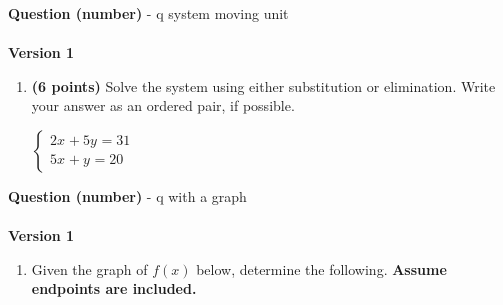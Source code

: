 \documentclass[12pt]{amsart}
\begin{document}
\begin{enumerate}[resume]
 \end{enumerate}\newpage\newpage\def \xis{3}\def \yis{5}\def \nomatcho{[2,5,3,2]}\def \a{-2}\def \c{-5}\def \b{3}\def \d{-2}\def \polyonesol{9}\def \polytwosol{-25}\def \xgoodone{-2x^{}}\def \ygoodone{+3y^{}}\def \xgoodtwo{-5x^{}}\def \ygoodtwo{-2y^{}}\def \unitize{[0,0,0,1,0,1]}\def \mtem{2}\def \ntem{5}\def \ptem{5}\def \qtem{5}\def \m{2}\def \n{5}\def \p{5}\def \q{1}\def \polytonesol{31}\def \polyttwosol{20}\def \xtgoodone{2x^{}}\def \ytgoodone{+5y^{}}\def \xtgoodtwo{5x^{}}\def \ytgoodtwo{+y^{}}{\Large{\bf Question (number)}} - q system moving unit\\ $ $ \\ {\bf Version 1} \\\begin{enumerate}[resume]
\item {\bf (6 points)} 
 Solve the system using either substitution or elimination. Write your answer as an ordered pair, if possible. 

$ \begin{cases} \xtgoodone \ytgoodone = \polytonesol \\
\xtgoodtwo \ytgoodtwo = \polyttwosol
\end{cases}$

 \vfill \vfill
 \end{enumerate}\newpage\newpage\def \vshift{1}\def \hshift{0}\def \chang{0}\def \findval{0}\def \yval{1}{\Large{\bf Question (number)}} - q with a graph\\ $ $ \\ {\bf Version 1} \\\begin{enumerate}[resume]

 
\item Given the graph of $f(x)$ below, determine the following. {\bf Assume endpoints are included.}
\vspace{2mm}

\end{enumerate}
\end{document}

